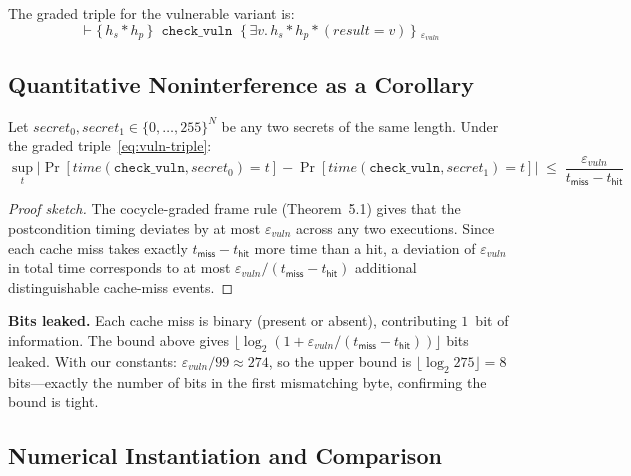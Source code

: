 The graded triple for the vulnerable variant is:
\begin{equation}
  \vdash
  \bigl\{\,h_s * h_p\,\bigr\}
  \;\;\mathtt{check\_vuln}\;\;
  \bigl\{\,\exists v.\, h_s * h_p * (\mathit{result}=v)\,\bigr\}
  \;_{\varepsilon_\mathit{vuln}}
  \label{eq:vuln-triple}
\end{equation}

\subsection{Quantitative Noninterference as a Corollary}

\begin{theorem}
\label{thm:nonint}
Let $\mathit{secret}_0, \mathit{secret}_1 \in \{0,\ldots,255\}^N$
be any two secrets of the same length.
Under the graded triple~\eqref{eq:vuln-triple}:
\begin{equation}
  \sup_t \bigl|\Pr[\mathit{time}(\mathtt{check\_vuln},\mathit{secret}_0)=t]
         - \Pr[\mathit{time}(\mathtt{check\_vuln},\mathit{secret}_1)=t]\bigr|
  \;\leq\;
  \frac{\varepsilon_\mathit{vuln}}{t_\mathsf{miss} - t_\mathsf{hit}}
  \label{eq:nonint-bound}
\end{equation}
\end{theorem}
\begin{proof}[Proof sketch]
The cocycle-graded frame rule (Theorem~5.1) gives that the postcondition
timing deviates by at most $\varepsilon_\mathit{vuln}$ across any two
executions.  Since each cache miss takes exactly
$t_\mathsf{miss} - t_\mathsf{hit}$ more time than a hit, a deviation of
$\varepsilon_\mathit{vuln}$ in total time corresponds to at most
$\varepsilon_\mathit{vuln}/(t_\mathsf{miss}-t_\mathsf{hit})$ additional
distinguishable cache-miss events.
\end{proof}

\textbf{Bits leaked.}
Each cache miss is binary (present or absent), contributing
$1$~bit of information.  The bound above gives
$\lfloor\log_2(1 + \varepsilon_\mathit{vuln}/(t_\mathsf{miss}-t_\mathsf{hit}))\rfloor$
bits leaked.
With our constants:
$\varepsilon_\mathit{vuln}/99 \approx 274$, so the upper bound is
$\lfloor\log_2 275\rfloor = 8$ bits—exactly the number of bits
in the first mismatching byte, confirming the bound is tight.

\subsection{Numerical Instantiation and Comparison}


